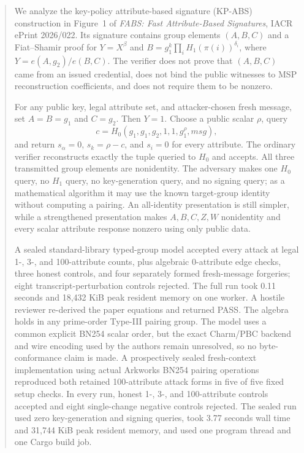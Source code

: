 \documentclass[10pt,a4paper]{article}
\begin{document}
\begin{abstract}
We analyze the key-policy attribute-based signature (KP-ABS) construction in
Figure~1 of \emph{FABS: Fast Attribute-Based Signatures}, IACR ePrint
2026/022. Its signature contains group elements $(A,B,C)$ and a
Fiat--Shamir proof for
$Y=X^\beta$ and
$B=g_1^k\prod_i H_1(\pi(i))^{\delta_i}$, where
$Y=e(A,g_2)/e(B,C)$. The verifier does not prove that $(A,B,C)$ came from an
issued credential, does not bind the public witnesses to MSP reconstruction
coefficients, and does not require them to be nonzero.

For any public key, legal attribute set, and attacker-chosen fresh message,
set $A=B=g_1$ and $C=g_2$. Then $Y=1$. Choose a public scalar $\rho$, query
\[
 c=H_0(g_1,g_1,g_2,1,1,g_1^\rho,\mathit{msg}),
\]
and return $s_\alpha=0$, $s_k=\rho-c$, and $s_i=0$ for every attribute.
The ordinary verifier reconstructs exactly the tuple queried to $H_0$ and
accepts. All three transmitted group elements are nonidentity. The adversary
makes one $H_0$ query, no $H_1$ query, no key-generation query, and no signing
query; as a mathematical algorithm it may use the known target-group identity
without computing a pairing. An all-identity presentation is still simpler, while a
strengthened presentation makes $A,B,C,Z,W$ nonidentity and every scalar
attribute response nonzero using only public data.

A sealed standard-library typed-group model accepted every attack at legal
1-, 3-, and 100-attribute counts, plus algebraic 0-attribute edge checks,
three honest controls, and four separately formed
fresh-message forgeries; eight transcript-perturbation controls rejected. The
full run took 0.11 seconds and 18,432 KiB peak resident memory on one worker.
A hostile reviewer re-derived the paper equations and returned PASS. The
algebra holds in any prime-order Type-III pairing group. The model uses a
common explicit BN254 scalar order, but the exact Charm/PBC backend and wire
encoding used by the authors remain unresolved, so no byte-conformance claim
is made. A prospectively sealed fresh-context implementation using actual
Arkworks BN254 pairing operations reproduced both retained 100-attribute
attack forms in five of five fixed setup checks. In every run, honest 1-, 3-, and
100-attribute controls accepted and eight single-change negative controls
rejected. The sealed run used zero key-generation and signing queries, took
3.77 seconds wall time and 31,744 KiB peak resident memory, and used one
program thread and one Cargo build job.
\end{abstract}
\end{document}

